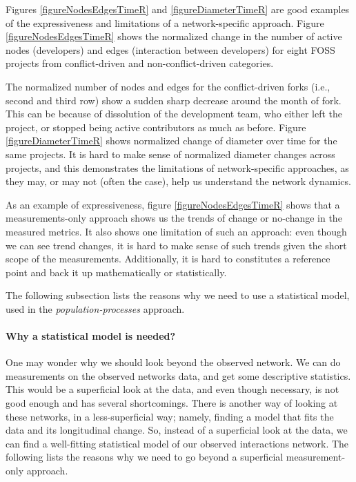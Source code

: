 \documentclass[12pt]{report}
\begin{document}
Figures \ref{figureNodesEdgesTimeR} and \ref{figureDiameterTimeR} are good examples of the expressiveness and limitations of a network-specific approach. Figure \ref{figureNodesEdgesTimeR} shows the normalized change in the number of active nodes (developers) and edges (interaction between developers) for eight FOSS projects from conflict-driven and non-conflict-driven categories. 

The normalized number of nodes and edges for the conflict-driven forks (i.e., second and third row) show a sudden sharp decrease around the month of fork. This can be because of dissolution of the development team, who either left the project, or stopped being active contributors as much as before. Figure  \ref{figureDiameterTimeR} shows normalized change of diameter over time for the same projects. It is hard to make sense of normalized diameter changes across projects, and this demonstrates the limitations of network-specific approaches, as they may, or may not (often the case), help us understand the network dynamics.

As an example of expressiveness, figure \ref{figureNodesEdgesTimeR} shows that a measurements-only approach shows us the trends of change or no-change in the measured metrics. It also shows one limitation of such an approach: even though we can see trend changes, it is hard to make sense of such trends given the short scope of the measurements. Additionally, it is hard to constitutes a reference point and back it up mathematically or statistically.

The following subsection lists the reasons why we need to use a statistical model, used in the \textit{population-processes} approach.

\paragraph*{Why a statistical model is needed?}
One may wonder why we should look beyond the observed network. We can do measurements on the observed networks data, and get some descriptive statistics. This would be a superficial look at the data, and even though necessary, is not good enough and has several shortcomings. 
There is another way of looking at these networks, in a less-superficial way; namely, finding a model that fits the data and its longitudinal change. So, instead of a superficial look at the data, we can find a well-fitting statistical model of our observed interactions network. The following lists the reasons why we need to go beyond a superficial measurement-only approach. 
\end{document}
